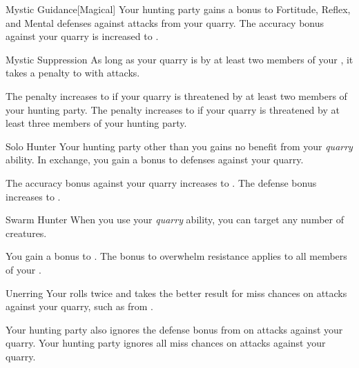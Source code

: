 {\begin{freeability}{Mystic Guidance}[Magical]
                \rankline
                 Your hunting party gains a  bonus to Fortitude, Reflex, and Mental defenses against attacks from your quarry.
                 The accuracy bonus against your quarry is increased to .
            \end{freeability}

            \begin{freeability}{Mystic Suppression}
                As long as your quarry is  by at least two members of your , it takes a  penalty to  with  attacks.

                \rankline
                 The penalty increases to  if your quarry is threatened by at least two members of your hunting party.
                 The penalty increases to  if your quarry is threatened by at least three members of your hunting party.
            \end{freeability}

            \begin{freeability}{Solo Hunter}
                Your hunting party other than you gains no benefit from your \textit{quarry} ability.
                In exchange, you gain a  bonus to defenses against your quarry.

                \rankline
                 The accuracy bonus against your quarry increases to .
                 The defense bonus increases to .
            \end{freeability}

            \begin{freeability}{Swarm Hunter}
                When you use your \textit{quarry} ability, you can target any number of creatures.

                \rankline
                 You gain a  bonus to .
                 The bonus to overwhelm resistance applies to all members of your .
            \end{freeability}

            \begin{freeability}{Unerring}
                Your  rolls twice and takes the better result for miss chances on attacks against your quarry, such as from .

                \rankline
                 Your hunting party also ignores the defense bonus from  on attacks against your quarry.
                 Your hunting party ignores all miss chances on attacks against your quarry.
            \end{freeability}

}
